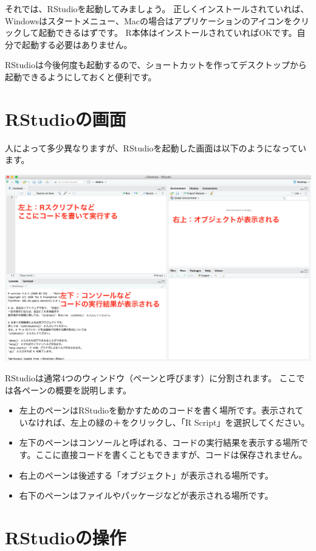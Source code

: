 \documentclass[]{book}
\providecommand{\tightlist}{%
  \setlength{\itemsep}{0pt}\setlength{\parskip}{0pt}}
\begin{document}
それでは、RStudioを起動してみましょう。
正しくインストールされていれば、Windowsはスタートメニュー、Macの場合はアプリケーションのアイコンをクリックして起動できるはずです。
R本体はインストールされていればOKです。自分で起動する必要はありません。

RStudioは今後何度も起動するので、ショートカットを作ってデスクトップから起動できるようにしておくと便利です。

\section{RStudioの画面}\label{rstudioux306eux753bux9762}

人によって多少異なりますが、RStudioを起動した画面は以下のようになっています。

\begin{center}\includegraphics[width=0.7\linewidth]{image/RStudio_screen} \end{center}

RStudioは通常4つのウィンドウ（ペーンと呼びます）に分割されます。
ここでは各ペーンの概要を説明します。

\begin{itemize}
\tightlist
\item
  左上のペーンはRStudioを動かすためのコードを書く場所です。表示されていなければ、左上の緑の＋をクリックし、「R
  Script」を選択してください。
\item
  左下のペーンはコンソールと呼ばれる、コードの実行結果を表示する場所です。ここに直接コードを書くこともできますが、コードは保存されません。
\item
  右上のペーンは後述する「オブジェクト」が表示される場所です。
\item
  右下のペーンはファイルやパッケージなどが表示される場所です。
\end{itemize}

\section{RStudioの操作}\label{rstudioux306eux64cdux4f5c}
\end{document}
